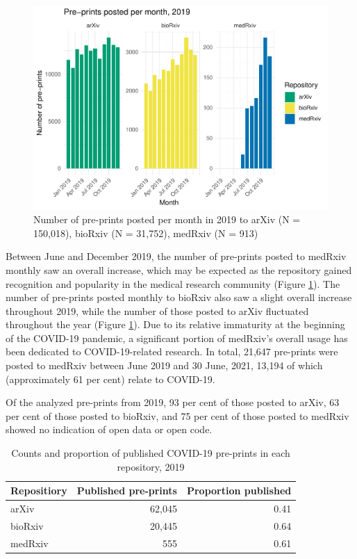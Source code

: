 \documentclass[
]{article}
\begin{document}
\begin{figure}[H]

{\centering \includegraphics[width=0.9\linewidth]{paper_files/figure-latex/2019-results-med-arxiv-1} 

}

\caption{Number of pre-prints posted per month in 2019 to arXiv (N = 150,018), bioRxiv (N = 31,752), medRxiv (N = 913)}\label{fig:2019-results-med-arxiv}
\end{figure}

Between June and December 2019, the number of pre-prints posted to medRxiv monthly saw an overall increase, which may be expected as the repository gained recognition and popularity in the medical research community (Figure \ref{fig:2019-results-med-arxiv}). The number of pre-prints posted monthly to bioRxiv also saw a slight overall increase throughout 2019, while the number of those posted to arXiv fluctuated throughout the year (Figure \ref{fig:2019-results-med-arxiv}). Due to its relative immaturity at the beginning of the COVID-19 pandemic, a significant portion of medRxiv's overall usage has been dedicated to COVID-19-related research. In total, 21,647 pre-prints were posted to medRxiv between June 2019 and 30 June, 2021, 13,194 of which (approximately 61 per cent) relate to COVID-19.

Of the analyzed pre-prints from 2019, 93 per cent of those posted to arXiv, 63 per cent of those posted to bioRxiv, and 75 per cent of those posted to medRxiv showed no indication of open data or open code.

\begin{table}

\caption{\label{tab:2019-published}Counts and proportion of published COVID-19 pre-prints in each repository, 2019}
\centering
\begin{tabular}[t]{l|r|r}
\hline
Repositiory & Published pre-prints & Proportion published\\
\hline
arXiv & 62,045 & 0.41\\
\hline
bioRxiv & 20,445 & 0.64\\
\hline
medRxiv & 555 & 0.61\\
\hline
\end{tabular}
\end{table}
\end{document}
